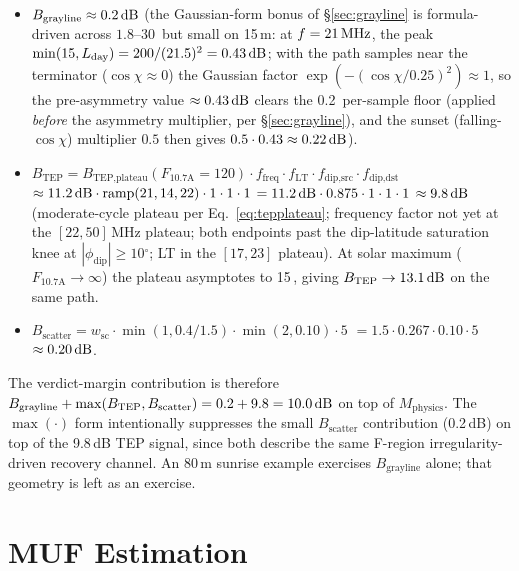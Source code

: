 \documentclass[11pt,a4paper]{article}
\newcommand{\SI}[2]{#1\,\text{#2}}
\newcommand{\si}[1]{\text{#1}}
\newcommand{\dB}{\text{dB}}
\newcommand{\MHz}{\text{MHz}}
\newcommand{\degree}{\ensuremath{{}^\circ}}
\begin{document}
\begin{itemize}[nosep]
  \item $B_{\text{grayline}} \approx \SI{0.2}{\dB}$ (the
        Gaussian-form bonus of \S\ref{sec:grayline} is
        formula-driven across
        $1.8\text{--}30$\,\si{\MHz} but small on 15\,m: at
        $f = \SI{21}{\MHz}$, the peak $\min(15, L_{\text{day}}) =
        200/(21.5)^2 = \SI{0.43}{\dB}$; with the path samples near
        the terminator ($\cos\chi \approx 0$) the Gaussian factor
        $\exp(-(\cos\chi/0.25)^2) \approx 1$, so the pre-asymmetry
        value $\approx \SI{0.43}{\dB}$ clears the \SI{0.2}{\dB}
        per-sample floor (applied \emph{before} the asymmetry
        multiplier, per \S\ref{sec:grayline}), and the sunset
        (falling-$\cos\chi$) multiplier $0.5$ then gives
        $0.5 \cdot 0.43 \approx \SI{0.22}{\dB}$).
  \item $B_{\text{TEP}} = B_{\text{TEP,plateau}}(F_{10.7\text{A}}{=}120)
        \cdot f_{\text{freq}} \cdot f_{\text{LT}} \cdot
        f_{\text{dip,src}} \cdot f_{\text{dip,dst}}$
        $\approx \SI{11.2}{\dB} \cdot \mathrm{ramp}(21,14,22)
        \cdot 1 \cdot 1 \cdot 1$
        $= \SI{11.2}{\dB} \cdot 0.875 \cdot 1 \cdot 1 \cdot 1$
        $\approx \SI{9.8}{\dB}$ (moderate-cycle plateau per
        Eq.~\ref{eq:tepplateau}; frequency factor not yet at the
        $[22, 50]$\,MHz plateau; both endpoints past the
        dip-latitude saturation knee at $|\phi_{\text{dip}}| \ge
        10\degree$; LT in the $[17, 23]$ plateau). At solar
        maximum ($F_{10.7\text{A}} \to \infty$) the plateau
        asymptotes to \SI{15}{\dB}, giving
        $B_{\text{TEP}} \to \SI{13.1}{\dB}$ on the same path.
  \item $B_{\text{scatter}} = w_{\text{sc}} \cdot
        \min(1, 0.4/1.5) \cdot \min(2, 0.10) \cdot 5$
        $= 1.5 \cdot 0.267 \cdot 0.10 \cdot 5$
        $\approx \SI{0.20}{\dB}$.
\end{itemize}
The verdict-margin contribution is therefore
$B_{\text{grayline}} + \max(B_{\text{TEP}}, B_{\text{scatter}}) =
0.2 + 9.8 = \SI{10.0}{\dB}$ on top of $M_{\text{physics}}$.  The
$\max(\cdot)$ form intentionally suppresses the small
$B_{\text{scatter}}$ contribution (0.2\,dB) on top of the
9.8\,dB TEP signal, since both describe the same F-region
irregularity-driven recovery channel.  An 80\,m sunrise example
exercises $B_{\text{grayline}}$ alone; that geometry is left as
an exercise.

\section{MUF Estimation}\label{sec:muf}
\end{document}
